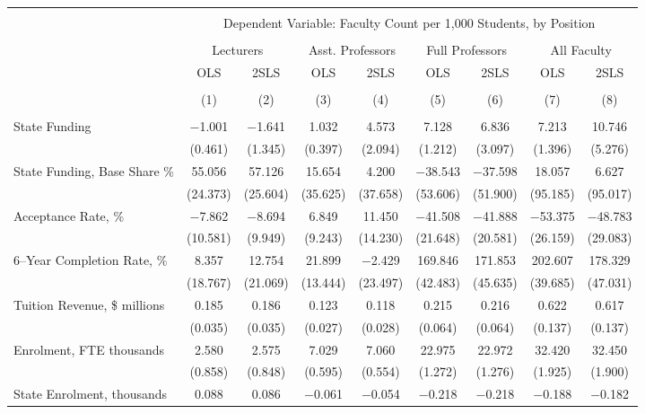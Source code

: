 
\begin{tabular}{@{\extracolsep{5pt}}lcccccccc} 
\\[-1.8ex]\hline 
\hline \\[-1.8ex] 
 & \multicolumn{8}{c}{Dependent Variable: Faculty Count per 1,000 Students, by Position} \\ 
\cline{2-9} 
\\[-1.8ex] & \multicolumn{2}{c}{Lecturers} & \multicolumn{2}{c}{Asst. Professors} & \multicolumn{2}{c}{Full Professors} & \multicolumn{2}{c}{All Faculty} \\ 
 & OLS & 2SLS & OLS & 2SLS & OLS & 2SLS & OLS & 2SLS \\ 
\\[-1.8ex] & (1) & (2) & (3) & (4) & (5) & (6) & (7) & (8)\\ 
\hline \\[-1.8ex] 
 State Funding & $-$1.001 & $-$1.641 & 1.032 & 4.573 & 7.128 & 6.836 & 7.213 & 10.746 \\ 
  & (0.461) & (1.345) & (0.397) & (2.094) & (1.212) & (3.097) & (1.396) & (5.276) \\ 
  State Funding, Base Share \% & 55.056 & 57.126 & 15.654 & 4.200 & $-$38.543 & $-$37.598 & 18.057 & 6.627 \\ 
  & (24.373) & (25.604) & (35.625) & (37.658) & (53.606) & (51.900) & (95.185) & (95.017) \\ 
  Acceptance Rate, \% & $-$7.862 & $-$8.694 & 6.849 & 11.450 & $-$41.508 & $-$41.888 & $-$53.375 & $-$48.783 \\ 
  & (10.581) & (9.949) & (9.243) & (14.230) & (21.648) & (20.581) & (26.159) & (29.083) \\ 
  6--Year Completion Rate, \% & 8.357 & 12.754 & 21.899 & $-$2.429 & 169.846 & 171.853 & 202.607 & 178.329 \\ 
  & (18.767) & (21.069) & (13.444) & (23.497) & (42.483) & (45.635) & (39.685) & (47.031) \\ 
  Tuition Revenue, \$ millions & 0.185 & 0.186 & 0.123 & 0.118 & 0.215 & 0.216 & 0.622 & 0.617 \\ 
  & (0.035) & (0.035) & (0.027) & (0.028) & (0.064) & (0.064) & (0.137) & (0.137) \\ 
  Enrolment, FTE thousands & 2.580 & 2.575 & 7.029 & 7.060 & 22.975 & 22.972 & 32.420 & 32.450 \\ 
  & (0.858) & (0.848) & (0.595) & (0.554) & (1.272) & (1.276) & (1.925) & (1.900) \\ 
  State Enrolment, thousands & 0.088 & 0.086 & $-$0.061 & $-$0.054 & $-$0.218 & $-$0.218 & $-$0.188 & $-$0.182 \\ 

\end{tabular}
